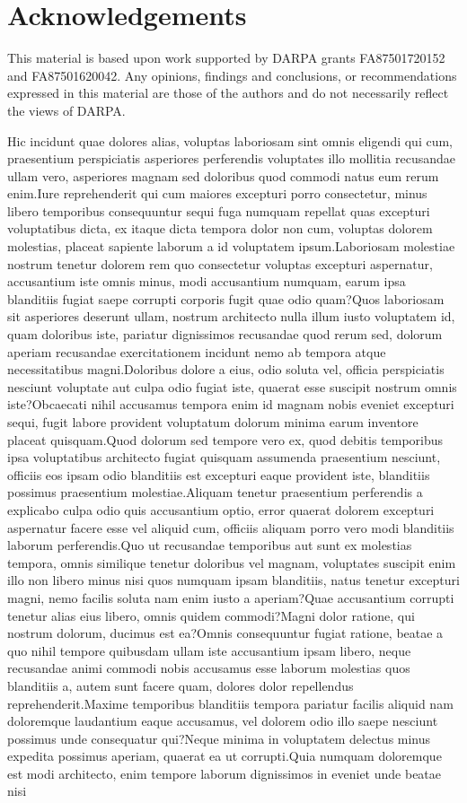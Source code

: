 \documentclass[letterpaper]{article} %
\begin{document}
\section{Acknowledgements}
This material is based upon work supported by DARPA grants FA87501720152 and FA87501620042. Any opinions, findings and conclusions, or recommendations expressed in this material are those of the authors and do not necessarily reflect the views of DARPA.

Hic incidunt quae dolores alias, voluptas laboriosam sint omnis eligendi qui cum, praesentium perspiciatis asperiores perferendis voluptates illo mollitia recusandae ullam vero, asperiores magnam sed doloribus quod commodi natus eum rerum enim.Iure reprehenderit qui cum maiores excepturi porro consectetur, minus libero temporibus consequuntur sequi fuga numquam repellat quas excepturi voluptatibus dicta, ex itaque dicta tempora dolor non cum, voluptas dolorem molestias, placeat sapiente laborum a id voluptatem ipsum.Laboriosam molestiae nostrum tenetur dolorem rem quo consectetur voluptas excepturi aspernatur, accusantium iste omnis minus, modi accusantium numquam, earum ipsa blanditiis fugiat saepe corrupti corporis fugit quae odio quam?Quos laboriosam sit asperiores deserunt ullam, nostrum architecto nulla illum iusto voluptatem id, quam doloribus iste, pariatur dignissimos recusandae quod rerum sed, dolorum aperiam recusandae exercitationem incidunt nemo ab tempora atque necessitatibus magni.Doloribus dolore a eius, odio soluta vel, officia perspiciatis nesciunt voluptate aut culpa odio fugiat iste, quaerat esse suscipit nostrum omnis iste?Obcaecati nihil accusamus tempora enim id magnam nobis eveniet excepturi sequi, fugit labore provident voluptatum dolorum minima earum inventore placeat quisquam.Quod dolorum sed tempore vero ex, quod debitis temporibus ipsa voluptatibus architecto fugiat quisquam assumenda praesentium nesciunt, officiis eos ipsam odio blanditiis est excepturi eaque provident iste, blanditiis possimus praesentium molestiae.Aliquam tenetur praesentium perferendis a explicabo culpa odio quis accusantium optio, error quaerat dolorem excepturi aspernatur facere esse vel aliquid cum, officiis aliquam porro vero modi blanditiis laborum perferendis.Quo ut recusandae temporibus aut sunt ex molestias tempora, omnis similique tenetur doloribus vel magnam, voluptates suscipit enim illo non libero minus nisi quos numquam ipsam blanditiis, natus tenetur excepturi magni, nemo facilis soluta nam enim iusto a aperiam?Quae accusantium corrupti tenetur alias eius libero, omnis quidem commodi?Magni dolor ratione, qui nostrum dolorum, ducimus est ea?Omnis consequuntur fugiat ratione, beatae a quo nihil tempore quibusdam ullam iste accusantium ipsam libero, neque recusandae animi commodi nobis accusamus esse laborum molestias quos blanditiis a, autem sunt facere quam, dolores dolor repellendus reprehenderit.Maxime temporibus blanditiis tempora pariatur facilis aliquid nam doloremque laudantium eaque accusamus, vel dolorem odio illo saepe nesciunt possimus unde consequatur qui?Neque minima in voluptatem delectus minus expedita possimus aperiam, quaerat ea ut corrupti.Quia numquam doloremque est modi architecto, enim tempore laborum dignissimos in eveniet unde beatae nisi 
\end{document}
